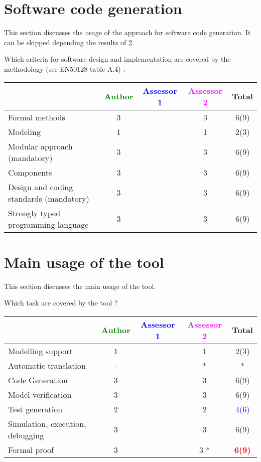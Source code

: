 \section{Software code generation}
This section discusses the usage of the approach for software code generation.
It can be skipped depending the results of \ref{main_usage}.

Which criteria for software design and implementation are covered by the methodology
(see EN50128 table A.4) :

\begin{tabular}{|l | c | c | c | c|}
\hline
& \textcolor{green}{Author} & \textcolor{blue}{Assessor 1} & \textcolor{magenta}{Assessor 2} & Total \\
\hline
Formal methods  & 3     & & 3     &  6(9) \\
\hline 
Modeling  & 1     & & 1     &  2(3) \\
\hline
Modular approach (mandatory) & 3     & & 3     &  6(9) \\
\hline
Components & 3     & & 3     &  6(9) \\
\hline
Design and coding standards (mandatory) & 3     & & 3     &  6(9) \\
\hline
Strongly typed programming language & 3     & & 3     &  6(9) \\
\hline

\end{tabular}



\section{Main usage of the tool}
\label{main_usage}

This section discusses the main usage of the tool.

Which task are covered by the tool ?


\begin{tabular}{|l | c | c | c | c|}
\hline
& \textcolor{green}{Author} & \textcolor{blue}{Assessor 1} & \textcolor{magenta}{Assessor 2} & Total \\
\hline 
Modelling support & 1     & & 1     &  2(3) \\
\hline
Automatic translation  & - & & * & * \\
\hline
Code Generation  & 3     & & 3     &  6(9) \\
\hline
Model verification & 3     & & 3     &  6(9) \\
\hline
Test generation & 2     & & 2     & \textcolor{blue}{4(6)}  \\
\hline
Simulation, execution, debugging & 3     & & 3     &  6(9) \\
\hline
Formal proof & 3     & & 3    * & \textcolor{red}{\textbf{6(9)}}  \\
\hline
\end{tabular}

